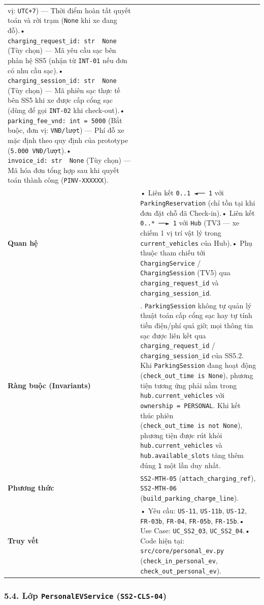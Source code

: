 \documentclass[11pt,a4paper]{article}
\begin{document}
\begin{longtable}[]{@{}
  >{\raggedright\arraybackslash}p{}
  >{\raggedright\arraybackslash}p{}@{}}
vị: \texttt{UTC+7}) --- Thời điểm hoàn tất quyết toán và rời trạm
(\texttt{None} khi xe đang đỗ).•
\texttt{charging\_request\_id:\ str\ \textbar{}\ None} (Tùy chọn) --- Mã
yêu cầu sạc bên phân hệ SS5 (nhận từ \texttt{INT-01} nếu đơn có nhu cầu
sạc).• \texttt{charging\_session\_id:\ str\ \textbar{}\ None} (Tùy chọn)
--- Mã phiên sạc thực tế bên SS5 khi xe được cấp cổng sạc (dùng để gọi
\texttt{INT-02} khi check-out).•
\texttt{parking\_fee\_vnd:\ int\ =\ 5000} (Bắt buộc, đơn vị:
\texttt{VNĐ/lượt}) --- Phí đỗ xe mặc định theo quy định của prototype
(\texttt{5.000\ VNĐ/lượt}).•
\texttt{invoice\_id:\ str\ \textbar{}\ None} (Tùy chọn) --- Mã hóa đơn
tổng hợp sau khi quyết toán thành công (\texttt{PINV-XXXXXX}). \\
\textbf{Quan hệ} & • Liên kết \texttt{0..1\ ◄──\ 1} với
\texttt{ParkingReservation} (chỉ tồn tại khi đơn đặt chỗ đã Check-in).•
Liên kết \texttt{0..*\ ──►\ 1} với \texttt{Hub} (TV3 --- xe chiếm 1 vị
trí vật lý trong \texttt{current\_vehicles} của Hub).• Phụ thuộc tham
chiếu tới \texttt{ChargingService} / \texttt{ChargingSession} (TV5) qua
\texttt{charging\_request\_id} và \texttt{charging\_session\_id}. \\
\textbf{Ràng buộc (Invariants)} & 1. \texttt{ParkingSession} không tự
quản lý thuật toán cấp cổng sạc hay tự tính tiền điện/phí quá giờ; mọi
thông tin sạc được liên kết qua \texttt{charging\_request\_id} /
\texttt{charging\_session\_id} của SS5.2. Khi \texttt{ParkingSession}
đang hoạt động (\texttt{check\_out\_time\ is\ None}), phương tiện tương
ứng phải nằm trong \texttt{hub.current\_vehicles} với
\texttt{ownership\ =\ PERSONAL}. Khi kết thúc phiên
(\texttt{check\_out\_time\ is\ not\ None}), phương tiện được rút khỏi
\texttt{hub.current\_vehicles} và \texttt{hub.available\_slots} tăng
thêm đúng \texttt{1} một lần duy nhất. \\
\textbf{Phương thức} & \texttt{SS2-MTH-05}
(\texttt{attach\_charging\_ref}), \texttt{SS2-MTH-06}
(\texttt{build\_parking\_charge\_line}). \\
\textbf{Truy vết} & • Yêu cầu: \texttt{US-11}, \texttt{US-11b},
\texttt{US-12}, \texttt{FR-03b}, \texttt{FR-04}, \texttt{FR-05b},
\texttt{FR-15b}.• Use Case: \texttt{UC\_SS2\_03}, \texttt{UC\_SS2\_04}.•
Code hiện tại: \texttt{src/core/personal\_ev.py}
(\texttt{check\_in\_personal\_ev},
\texttt{check\_out\_personal\_ev}). \\
\end{longtable}

\hypertarget{lux1edbp-personalevservice-ss2-cls-04}{%
\subsubsection{\texorpdfstring{5.4. Lớp \texttt{PersonalEVService}
(\texttt{SS2-CLS-04})}{5.4. Lớp PersonalEVService (SS2-CLS-04)}}\label{lux1edbp-personalevservice-ss2-cls-04}}
\end{document}
